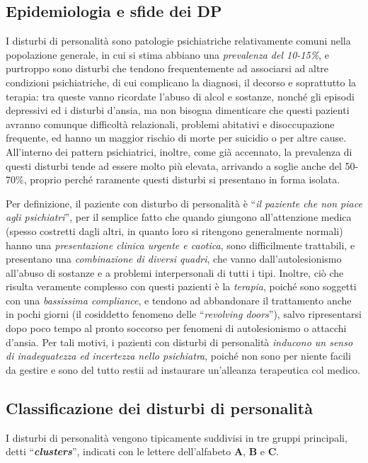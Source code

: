 \subsection{Epidemiologia e sfide dei DP}

I disturbi di personalità sono patologie psichiatriche relativamente
comuni nella popolazione generale, in cui si stima abbiano una
\emph{prevalenza del 10-15\%}, e purtroppo sono disturbi che tendono
frequentemente ad associarsi ad altre condizioni psichiatriche, di cui
complicano la diagnosi, il decorso e soprattutto la terapia: tra queste
vanno ricordate l'abuso di alcol e sostanze, nonché gli episodi
depressivi ed i disturbi d'ansia, ma non bisogna dimenticare che questi
pazienti avranno comunque difficoltà relazionali, problemi abitativi e
disoccupazione frequente, ed hanno un maggior rischio di morte per
suicidio o per altre cause. All'interno dei pattern psichiatrici,
inoltre, come già accennato, la prevalenza di questi disturbi tende ad
essere molto più elevata, arrivando a soglie anche del 50-70\%, proprio
perché raramente questi disturbi si presentano in forma isolata.

Per definizione, il paziente con disturbo di personalità è ``\emph{il
paziente che non piace agli psichiatri}'', per il semplice fatto che
quando giungono all'attenzione medica (spesso costretti dagli altri, in
quanto loro si ritengono generalmente normali) hanno una
\emph{presentazione clinica urgente e caotica}, sono difficilmente
trattabili, e presentano una \emph{combinazione di diversi quadri}, che
vanno dall'autolesionismo all'abuso di sostanze e a problemi
interpersonali di tutti i tipi. Inoltre, ciò che risulta veramente
complesso con questi pazienti è la \emph{terapia}, poiché sono soggetti
con una \emph{bassissima compliance}, e tendono ad abbandonare il
trattamento anche in pochi giorni (il cosiddetto fenomeno delle
``\emph{revolving doors}''), salvo ripresentarsi dopo poco tempo al
pronto soccorso per fenomeni di autolesionismo o attacchi d'ansia. Per
tali motivi, i pazienti con disturbi di personalità \emph{inducono un
senso di inadeguatezza ed incertezza nello psichiatra}, poiché non sono
per niente facili da gestire e sono del tutto restii ad instaurare
un'alleanza terapeutica col medico.

\subsection{Classificazione dei disturbi di personalità}

I disturbi di personalità vengono tipicamente suddivisi in tre gruppi
principali, detti ``\textbf{\emph{clusters}}'', indicati con le lettere
dell'alfabeto \textbf{A}, \textbf{B} e \textbf{C}.

